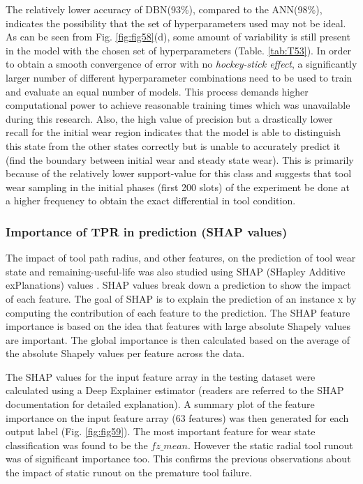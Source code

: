 \documentclass[preprint,review,12pt]{elsarticle}
\begin{document}
The relatively lower accuracy of DBN(93\%), compared to the ANN(98\%), indicates the possibility that the set of hyperparameters used may not be ideal. As can be seen from Fig. \ref{fig:fig58}(d), some amount of variability is still present in the model with the chosen set of hyperparameters (Table. \ref{tab:T53}). In order to obtain a smooth convergence of error with no \emph{hockey-stick effect}, a significantly larger number of different hyperparameter combinations need to be used to train and evaluate an equal number of models. This process demands higher computational power to achieve reasonable training times which was unavailable during this research. Also, the high value of precision but a drastically lower recall for the initial wear region indicates that the model is able to distinguish this state from the other states correctly but is unable to accurately predict it (find the boundary between initial wear and steady state wear). This is primarily because of the relatively lower support-value for this class and suggests that tool wear sampling in the initial phases (first 200 slots) of the experiment be done at a higher frequency to obtain the exact differential in tool condition. \par

\iffalse
\subsubsection{Importance of TPR in prediction (SHAP values)}

The impact of tool path radius, and other features, on the prediction of tool wear state and remaining-useful-life was also studied using SHAP (SHapley Additive exPlanations) values \cite{CITE34}. SHAP values break down a prediction to show the impact of each feature. The goal of SHAP is to explain the prediction of an instance x by computing the contribution of each feature to the prediction. The SHAP feature importance is based on the idea that features with large absolute Shapely values are important. The global importance is then calculated based on the average of the absolute Shapely values per feature across the data.\par

The SHAP values for the input feature array in the testing dataset were calculated using a Deep Explainer estimator (readers are referred to the SHAP documentation for detailed explanation). A summary plot of the feature importance on the input feature array (63 features) was then generated for each output label (Fig. \ref{fig:fig59}). The most important feature for wear state classification was found to be the $fz\_mean$. However the static radial tool runout was of significant importance too. This confirms the previous observations about the impact of static runout on the premature tool failure. \par
\end{document}
